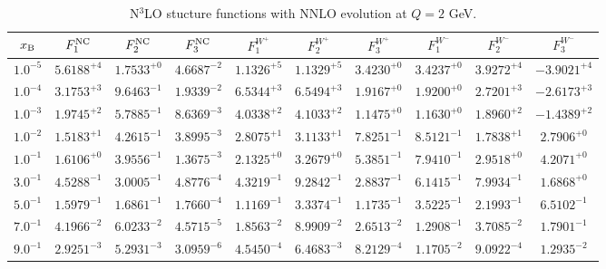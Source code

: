 \begin{table}[h]
\begin{adjustbox}{width=\textwidth}
\begin{tabular}{|c||c|c|c|c|c|c|c|c|c|}
\hline
$x_{\rm B}$ & $F_1^{\rm NC}$ & $F_2^{\rm NC}$ & $F_3^{\rm NC}$ & $F_1^{W^+}$ & $F_2^{W^+}$ & $F_3^{W^+}$ & $F_1^{W^-}$ & $F_2^{W^-}$ & $F_3^{W^-}$ \\
\hline
$ 1.0^{-5}$ & $ 5.6188^{+4}$ & $ 1.7533^{+0}$ & $ 4.6687^{-2}$ & $ 1.1326^{+5}$ & $ 1.1329^{+5}$ & $ 3.4230^{+0}$ & $ 3.4237^{+0}$ & $ 3.9272^{+4}$ & $-3.9021^{+4}$ \\
$ 1.0^{-4}$ & $ 3.1753^{+3}$ & $ 9.6463^{-1}$ & $ 1.9339^{-2}$ & $ 6.5344^{+3}$ & $ 6.5494^{+3}$ & $ 1.9167^{+0}$ & $ 1.9200^{+0}$ & $ 2.7201^{+3}$ & $-2.6173^{+3}$ \\
$ 1.0^{-3}$ & $ 1.9745^{+2}$ & $ 5.7885^{-1}$ & $ 8.6369^{-3}$ & $ 4.0338^{+2}$ & $ 4.1033^{+2}$ & $ 1.1475^{+0}$ & $ 1.1630^{+0}$ & $ 1.8960^{+2}$ & $-1.4389^{+2}$ \\
$ 1.0^{-2}$ & $ 1.5183^{+1}$ & $ 4.2615^{-1}$ & $ 3.8995^{-3}$ & $ 2.8075^{+1}$ & $ 3.1133^{+1}$ & $ 7.8251^{-1}$ & $ 8.5121^{-1}$ & $ 1.7838^{+1}$ & $ 2.7906^{+0}$ \\
$ 1.0^{-1}$ & $ 1.6106^{+0}$ & $ 3.9556^{-1}$ & $ 1.3675^{-3}$ & $ 2.1325^{+0}$ & $ 3.2679^{+0}$ & $ 5.3851^{-1}$ & $ 7.9410^{-1}$ & $ 2.9518^{+0}$ & $ 4.2071^{+0}$ \\
$ 3.0^{-1}$ & $ 4.5288^{-1}$ & $ 3.0005^{-1}$ & $ 4.8776^{-4}$ & $ 4.3219^{-1}$ & $ 9.2842^{-1}$ & $ 2.8837^{-1}$ & $ 6.1415^{-1}$ & $ 7.9934^{-1}$ & $ 1.6868^{+0}$ \\
$ 5.0^{-1}$ & $ 1.5979^{-1}$ & $ 1.6861^{-1}$ & $ 1.7660^{-4}$ & $ 1.1169^{-1}$ & $ 3.3374^{-1}$ & $ 1.1735^{-1}$ & $ 3.5225^{-1}$ & $ 2.1993^{-1}$ & $ 6.5102^{-1}$ \\
$ 7.0^{-1}$ & $ 4.1966^{-2}$ & $ 6.0233^{-2}$ & $ 4.5715^{-5}$ & $ 1.8563^{-2}$ & $ 8.9909^{-2}$ & $ 2.6513^{-2}$ & $ 1.2908^{-1}$ & $ 3.7085^{-2}$ & $ 1.7901^{-1}$ \\
$ 9.0^{-1}$ & $ 2.9251^{-3}$ & $ 5.2931^{-3}$ & $ 3.0959^{-6}$ & $ 4.5450^{-4}$ & $ 6.4683^{-3}$ & $ 8.2129^{-4}$ & $ 1.1705^{-2}$ & $ 9.0922^{-4}$ & $ 1.2935^{-2}$ \\
\hline
\end{tabular}
\end{adjustbox}\caption{N$^{3}$LO stucture functions with NNLO evolution at $Q = 2$ GeV.}
\label{tab:N3LO-Q2}
\end{table}


